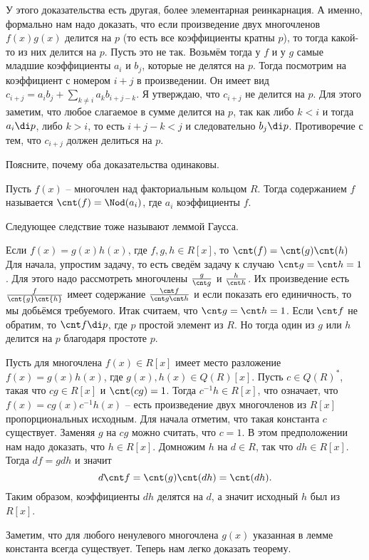 У этого доказательства есть другая, более элементарная реинкарнация. А именно, формально нам надо доказать, что если произведение двух многочленов $f(x)g(x)$ делится на $p$ (то есть все коэффициенты кратны $p$), то тогда какой-то из них делится на $p$. Пусть это не так. Возьмём тогда у $f$ и у $g$ самые младшие коэффициенты $a_i$ и  $b_j$, которые не делятся на $p$. Тогда посмотрим на коэффициент с номером $i+j$  в произведении. Он имеет вид $c_{i+j}= a_ib_j + \sum_{k \neq i} a_k b_{i+j -k}$. Я утверждаю, что $c_{i+j}$ не делится на $p$. Для этого заметим, что любое слагаемое в сумме делится на $p$, так как либо $k<i$ и тогда $a_i \di p$, либо $k>i$, то есть $i+j-k<j$ и следовательно $b_j \di p$. Противоречие с тем, что $c_{i+j}$ должен делиться на $p$.   
\endproof
\elm

\upr Поясните, почему оба доказательства одинаковы.
\eupr

\dfn Пусть $f(x)$ -- многочлен над факториальным кольцом $R$. Тогда содержанием $f$ называется $\cnt(f)=\Nod (a_i)$, где $a_i$ коэффициенты $f$. 
\edfn

Следующее следствие тоже называют леммой Гаусса.

\crl Если $f(x)=g(x)h(x)$, где $f,g,h \in R[x]$, то $\cnt(f)=\cnt(g)\cnt(h)$
\proof Для начала, упростим задачу, то есть сведём задачу к случаю $\cnt g= \cnt h =1$. Для этого надо рассмотреть многочлены $\frac{g}{\cnt g}$ и $\frac{h}{\cnt h}$. Их произведение есть $\frac{f}{\cnt{g}\cnt{h}}$ имеет содержание $\frac{\cnt f}{\cnt g \cnt h}$ и если показать его единичность, то мы добьёмся требуемого. Итак считаем, что $\cnt g= \cnt h=1$. Если $\cnt f$ не обратим, то $\cnt f \di p$, где $p$ простой элемент из $R$. Но тогда один из $g$ или $h$ делится на $p$ благодаря простоте $p$. 
\endproof
\ecrl


\lm Пусть для многочлена $f(x) \in R[x]$  имеет место разложение $f(x)=g(x)h(x)$, где  $g(x), h(x) \in Q(R)[x]$. Пусть $c \in Q(R)^*$, такая что $cg \in R[x]$ и $\cnt(cg)=1$. Тогда $c^{-1}h \in R[x]$, что означает, что $f(x)=cg(x)c^{-1}h(x)$ -- есть произведение двух многочленов из $R[x]$ пропорциональных исходным.
\proof Для начала отметим, что такая константа $c$ существует. Заменяя $g$ на $cg$ можно считать, что $c=1$. В этом предположении нам надо доказать, что $h\in R[x]$.
Домножим $h$ на $d\in R$, так что $dh \in R[x]$. Тогда $df=g dh$ и значит
$$d\cnt f = \cnt(g) \cnt(dh)=\cnt(dh).$$
Таким образом, коэффициенты $dh$ делятся на $d$, а значит исходный $h$ был из $R[x]$.
\endproof
\elm

Заметим, что для любого ненулевого многочлена $g(x)$ указанная в лемме константа всегда существует. Теперь нам легко доказать теорему.


